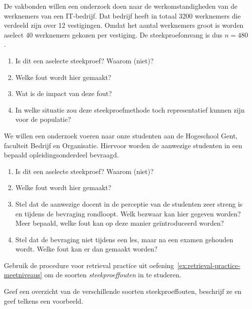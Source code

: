 \begin{exercise}
  De vakbonden willen een onderzoek doen naar de werkomstandigheden van de werknemers van een IT-bedrijf. Dat bedrijf heeft in totaal 3200 werknemers die verdeeld zijn over 12 vestigingen. Omdat het aantal werknemers groot is worden aselect 40 werknemers gekozen per vestiging. De steekproefomvang is dus $n = 480$.
  
  \begin{enumerate}[label=\alph*.]
    \item Is dit een aselecte steekproef? Waarom (niet)?
    \item Welke fout wordt hier gemaakt?
    \item Wat is de impact van deze fout?
    \item In welke situatie zou deze steekproefmethode toch representatief kunnen zijn voor de populatie?
  \end{enumerate}
\end{exercise}

\begin{exercise}
  We willen een onderzoek voeren naar onze studenten aan de Hogeschool Gent, faculteit Bedrijf en Organisatie. Hiervoor worden de aanwezige studenten in een bepaald opleidingsonderdeel bevraagd.
  
  \begin{enumerate}[label=\alph*.]
    \item Is dit een aselecte steekproef? Waarom (niet)?
    \item Welke fout wordt hier gemaakt?
    \item Stel dat de aanwezige docent in de perceptie van de studenten zeer streng is en tijdens de bevraging rondloopt. Welk bezwaar kan hier gegeven worden? Meer bepaald, welke fout kan op deze manier ge\"introduceerd worden?
    \item Stel dat de bevraging niet tijdens een les, maar na een examen gehouden wordt. Welke fout kan er dan gemaakt worden?
  \end{enumerate}
\end{exercise}

\begin{exercise}
  Gebruik de procedure voor retrieval practice uit oefening~\ref{ex:retrieval-practice-meetniveaus} om de soorten \emph{steekproeffouten} in te studeren.
  
  Geef een overzicht van de verschillende soorten steekproeffouten, beschrijf ze en geef telkens een voorbeeld.
\end{exercise}